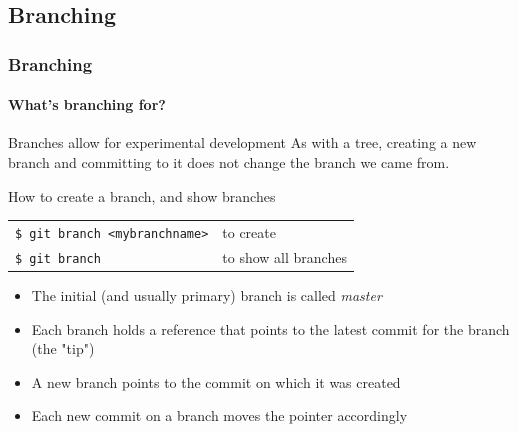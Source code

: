 \subsection{Branching}

\begin{frame}
\frametitle{Branching}
\framesubtitle{What's branching for?}

\begin{block}{Branches allow for experimental development}
As with a tree, creating a new branch and committing to it does not change the branch we came from.
\end{block}

\begin{block}{How to create a branch, and show branches}
\begin{tabular}{ll}
\texttt{\$ git branch <mybranchname>} & to create \\
\texttt{\$ git branch} & to show all branches
\end{tabular}

\medskip
\begin{itemize}
\item The initial (and usually primary) branch is called {\em master}
\item Each branch holds a reference that points to the latest commit for the branch (the "tip")
\item A new branch points to the commit on which it was created
\item Each new commit on a branch moves the pointer accordingly
\end{itemize}
\end{block}

\end{frame}


